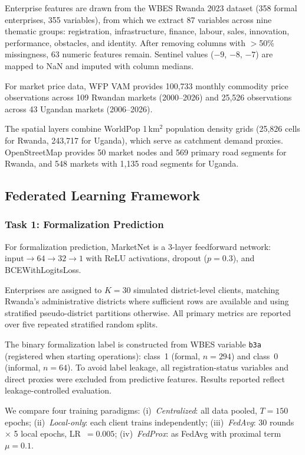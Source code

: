 \documentclass{article}
\begin{document}
Enterprise features are drawn from the WBES Rwanda 2023 dataset \cite{worldbank2023wbes} (358 formal enterprises, 355 variables), from which we extract 87 variables across nine thematic groups: registration, infrastructure, finance, labour, sales, innovation, performance, obstacles, and identity.
After removing columns with $>$50\% missingness, 63 numeric features remain.
Sentinel values ($-9$, $-8$, $-7$) are mapped to NaN and imputed with column medians.

For market price data, WFP VAM \cite{wfp2024vam} provides 100,733 monthly commodity price observations across 109 Rwandan markets (2000--2026) and 25,526 observations across 43 Ugandan markets (2006--2026).

The spatial layers combine WorldPop \cite{tatem2017worldpop} 1\,km$^2$ population density grids (25,826 cells for Rwanda, 243,717 for Uganda), which serve as catchment demand proxies.
OpenStreetMap \cite{haklay2008openstreetmap} provides 50 market nodes and 569 primary road segments for Rwanda, and 548 markets with 1,135 road segments for Uganda.

\subsection{Federated Learning Framework}

\subsubsection{Task 1: Formalization Prediction}

For formalization prediction, MarketNet is a 3-layer feedforward network: $\text{input} \to 64 \to 32 \to 1$ with ReLU activations, dropout ($p{=}0.3$), and BCEWithLogitsLoss.

Enterprises are assigned to $K{=}30$ simulated district-level clients, matching Rwanda's administrative districts where sufficient rows are available and using stratified pseudo-district partitions otherwise.
All primary metrics are reported over five repeated stratified random splits.

The binary formalization label is constructed from WBES variable \texttt{b3a} (registered when starting operations): class~1 (formal, $n{=}294$) and class~0 (informal, $n{=}64$).
To avoid label leakage, all registration-status variables and direct proxies were excluded from predictive features.
Results reported reflect leakage-controlled evaluation.

We compare four training paradigms:
(i)~\emph{Centralized}: all data pooled, $T{=}150$ epochs;
(ii)~\emph{Local-only}: each client trains independently;
(iii)~\emph{FedAvg}: 30 rounds $\times$ 5 local epochs, LR~$= 0.005$;
(iv)~\emph{FedProx}: as FedAvg with proximal term $\mu{=}0.1$.
\end{document}
